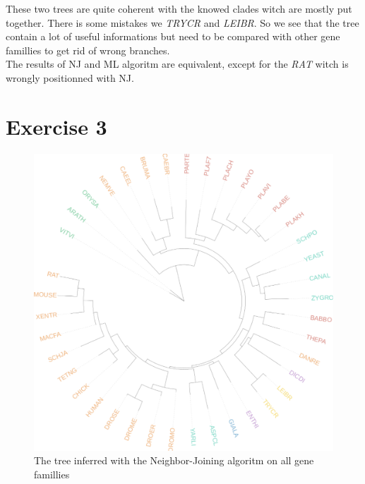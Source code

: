 \documentclass[]{article}
\theoremstyle{definition}
\begin{document}
These two trees are quite coherent with the knowed clades witch are mostly put together. There is some mistakes we \textit{TRYCR} and \textit{LEIBR}. So we see that the tree contain a lot of useful informations but need to be compared with other gene famillies to get rid of wrong branches. \\
The results of NJ and ML algoritm are equivalent, except for the \textit{RAT} witch is wrongly positionned with NJ.
\section{Exercise 3}

\begin{figure}[H]
	\includegraphics*[width = \linewidth]{image/Nj_ex3.pdf}
	\caption{ The tree inferred with the Neighbor-Joining algoritm on all gene famillies }
\end{figure}
\end{document}
